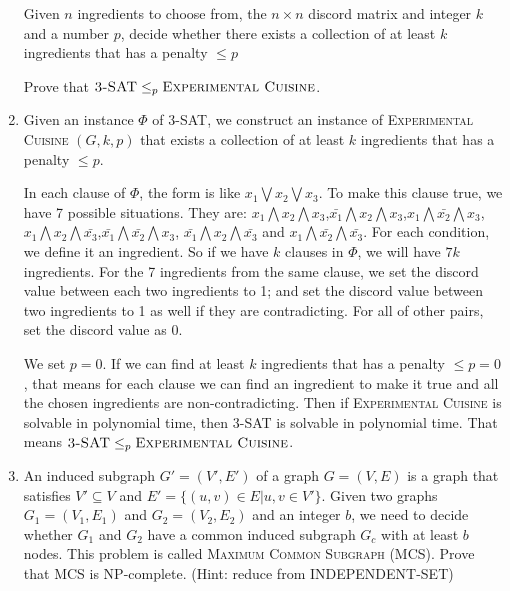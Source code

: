 \documentclass[12pt,a4paper]{article}
\makeatletter
\newtheorem*{solution}{Solution}
\theoremstyle{definition}
\renewenvironment{solution}[1][Solution] {\par\pushQED{\qed}\normalfont\topsep6\p@\@plus6\p@\relax\trivlist\item[\hskip\labelsep\bfseries#1\@addpunct{.}]\ignorespaces}{\popQED\endtrivlist\@endpefalse} \makeatother
\makeatother
\begin{document}
\begin{enumerate}
        Given $n$ ingredients to choose from, the $n\times n$ discord matrix and integer $k$ and a number $p$,  decide whether there exists a collection of at least $k$ ingredients that has a penalty $\leqslant p$

    Prove that $\textsc{3-SAT}\leq_p\textsc{Experimental Cuisine}$.
    
    \begin{solution}
        Given an instance $ \Phi $ of 3-SAT, we construct an instance of \textsc{Experimental Cuisine} $ (G,k,p)$ that exists a collection of at least $k$ ingredients that has a penalty $\leqslant p$.

        In each clause of $ \Phi $, the form is like $ x_1 \bigvee x_2 \bigvee x_3 $. To make this clause true, we have 7 possible situations. They are:  $ x_1 \bigwedge  x_2 \bigwedge  x_3$,$ \bar{x_1} \bigwedge  x_2 \bigwedge  x_3$,$ x_1 \bigwedge  \bar{x_2} \bigwedge  x_3$,$ x_1 \bigwedge  x_2 \bigwedge  \bar{x_3}$,$ \bar{x_1} \bigwedge  \bar{x_2} \bigwedge  x_3$, $ \bar{x_1} \bigwedge  x_2 \bigwedge  \bar{x_3}$ and $ x_1 \bigwedge  \bar{x_2} \bigwedge  \bar{x_3}$. For each condition, we define it an ingredient. So if we have $ k $ clauses in $ \Phi $, we will have $ 7k $ ingredients. For the 7 ingredients from the same clause, we set the discord value between each two ingredients to 1; and set the discord value between two ingredients to 1 as well if they are contradicting. For all of other pairs, set the discord value as 0.

        We set $ p = 0 $. If we can find  at least $k$ ingredients that has a penalty $\leqslant p = 0$, that means for each clause we can find an ingredient to make it true and all the chosen ingredients are non-contradicting. Then if \textsc{Experimental Cuisine} is solvable in polynomial time, then \textsc{3-SAT} is solvable in polynomial time. That means $\textsc{3-SAT}\leq_p\textsc{Experimental Cuisine}$.
        \end{solution}

    \item An induced subgraph $G'=(V',E')$ of a graph $G=(V,E)$ is a graph that satisfies $V'\subseteq V$ and $E' =\{(u,v)\in E| u,v\in V'\}$. Given two graphs $G_1=(V_1,E_1)$ and $G_2=(V_2,E_2)$ and an integer $b$, we need to decide whether $G_1$ and $G_2$ have a common induced subgraph $G_c$ with at least $b$ nodes. This problem is called \textsc{Maximum Common Subgraph} (MCS). Prove that MCS is NP-complete. (Hint: reduce from \textsc{INDEPENDENT-SET})


\end{enumerate}
\end{document}
